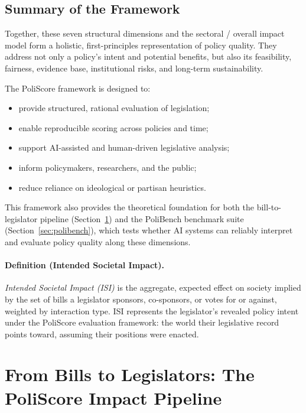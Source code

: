 \documentclass[12pt]{article}
\begin{document}
\subsection*{Summary of the Framework}

Together, these seven structural dimensions and the sectoral / overall impact model form a holistic, first-principles
representation of policy quality. They address not only a policy's intent and potential benefits, but also its feasibility,
fairness, evidence base, institutional risks, and long-term sustainability.

The PoliScore framework is designed to:
\begin{itemize}
    \item provide structured, rational evaluation of legislation;
    \item enable reproducible scoring across policies and time;
    \item support AI-assisted and human-driven legislative analysis;
    \item inform policymakers, researchers, and the public;
    \item reduce reliance on ideological or partisan heuristics.
\end{itemize}

This framework also provides the theoretical foundation for both the bill-to-legislator pipeline (Section~\ref{sec:pipeline})
and the PoliBench benchmark suite (Section~\ref{sec:polibench}), which tests whether AI systems can reliably interpret and
evaluate policy quality along these dimensions.

\paragraph{Definition (Intended Societal Impact).}
\emph{Intended Societal Impact (ISI)} is the aggregate, expected effect on society implied by the set of bills a legislator
sponsors, co-sponsors, or votes for or against, weighted by interaction type. ISI represents the legislator’s revealed
policy intent under the PoliScore evaluation framework: the world their legislative record points toward, assuming their
positions were enacted.


\section{From Bills to Legislators: The PoliScore Impact Pipeline}
\label{sec:pipeline}
\end{document}
